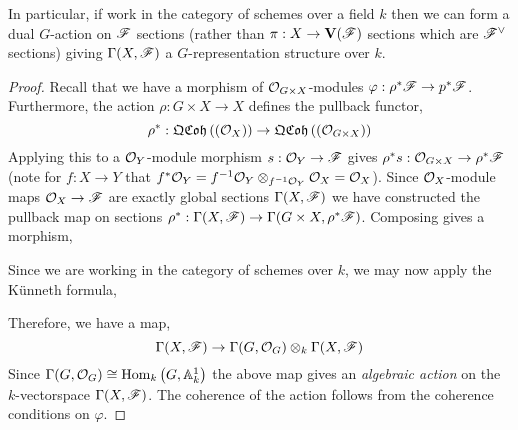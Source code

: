 \documentclass[12pt]{article}
\begin{document}
\begin{proposition}
In particular, if work in the category of schemes over a field $k$ then we can form a dual $G$-action on $\mathscr{F}$ sections (rather than $\pi : X \to \mathbf{V}(\mathscr{F})$ sections which are $\mathscr{F}^\vee$ sections) giving $\Gamma(X, \mathscr{F})$ a $G$-representation structure over $k$. 
\end{proposition}

\begin{proof}
Recall that we have a morphism of $\mathcal{O}_{G \times X}$-modules $\varphi : \rho^* \mathscr{F} \to p^* \mathscr{F}$. Furthermore, the action $\rho : G \times X \to X$ defines the pullback functor,
\[ \rho^* : \mathfrak{QCoh}\left((\mathcal{O}_{X})\right) \to \mathfrak{QCoh}\left((\mathcal{O}_{G \times X})\right) \]
Applying this to a $\mathcal{O}_{Y}$-module morphism $s : \mathcal{O}_{Y} \to \mathscr{F}$ gives $\rho^* s : \mathcal{O}_{G \times X} \to \rho^* \mathscr{F}$ (note for $f : X \to Y$ that $f^* \mathcal{O}_{Y} = f^{-1} \mathcal{O}_{Y} \otimes_{f^{-1} \mathcal{O}_{Y}} \mathcal{O}_{X} = \mathcal{O}_{X}$). Since $\mathcal{O}_{X}$-module maps $\mathcal{O}_{X} \to \mathscr{F}$ are exactly global sections $\Gamma(X, \mathscr{F})$ we have constructed the pullback map on sections $\rho^* :  \Gamma(X, \mathscr{F}) \to \Gamma(G \times X, \rho^* \mathscr{F})$. Composing gives a morphism,
\begin{center}
\end{center}
Since we are working in the category of schemes over $k$, we may now apply the K\"{u}nneth formula,
\begin{center}
\end{center}
Therefore, we have a map,
\[ \Gamma(X, \mathscr{F}) \to \Gamma(G, \mathcal{O}_{G}) \otimes_k \Gamma(X, \mathscr{F}) \]
Since $\Gamma(G, \mathcal{O}_{G}) \cong \mathrm{Hom}_{k} \left( G, \mathbb{A}^1_k \right)$ the above map gives an \textit{algebraic action} on the $k$-vectorspace $\Gamma(X, \mathscr{F})$. 
The coherence of the action follows from the coherence conditions on $\varphi$. 
\end{proof}
\end{document}
